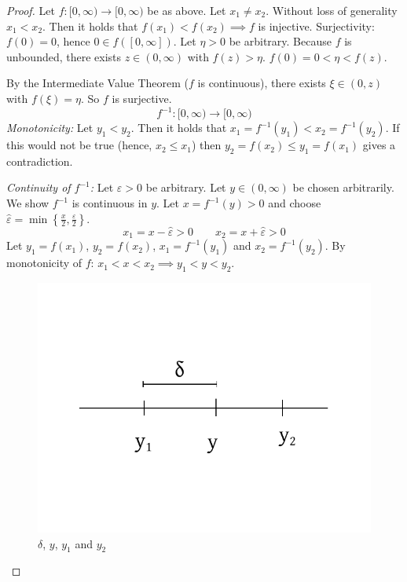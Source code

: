 \documentclass{article}
\newcommand{\set}[1]{\left\{#1\right\}}
\begin{document}
\begin{proof}
  Let $f:[0,\infty) \to [0,\infty)$ be as above.
  Let $x_1 \neq x_2$. Without loss of generality $x_1 < x_2$.
  Then it holds that $f(x_1) < f(x_2) \implies f$ is injective.
  Surjectivity: $f(0) = 0$, hence $0 \in f([0,\infty])$.
  Let $\eta > 0$ be arbitrary. Because $f$ is unbounded, there exists $z \in (0,\infty)$ with $f(z) > \eta$.
  $f(0) = 0 < \eta < f(z)$.

  By the Intermediate Value Theorem ($f$ is continuous), there exists $\xi \in (0,z)$ with $f(\xi) = \eta$.
  So $f$ is surjective.
  \[ f^{-1}: [0,\infty) \to [0,\infty) \]
  \emph{Monotonicity:} Let $y_1 < y_2$. Then it holds that $x_1 = f^{-1}(y_1) < x_2 = f^{-1}(y_2)$.
  If this would not be true (hence, $x_2 \leq x_1$) then $y_2 = f(x_2) \leq y_1 = f(x_1)$ gives a contradiction.

  \emph{Continuity of $f^{-1}$:}
  Let $\varepsilon > 0$ be arbitrary. Let $y \in (0,\infty)$ be chosen arbitrarily.
  We show $f^{-1}$ is continuous in $y$.
  Let $x = f^{-1}(y) > 0$ and choose $\hat\varepsilon = \min\set{\frac{x}2, \frac{\varepsilon}2}$.
  \[ x_1 = x - \hat\varepsilon > 0 \qquad x_2 = x + \hat \varepsilon > 0 \]
  Let $y_1 = f(x_1)$, $y_2 = f(x_2)$, $x_1 = f^{-1}(y_1)$ and $x_2 = f^{-1}(y_2)$.
  By monotonicity of $f$: $x_1 < x < x_2 \implies y_1 < y < y_2$.

  \begin{figure}[t]
    \begin{center}
      \includegraphics{img/24_setup_delta.pdf}
      \caption{$\delta$, $y$, $y_1$ and $y_2$}
      \label{img:dyyy}
    \end{center}
  \end{figure}


\end{proof}
\end{document}
